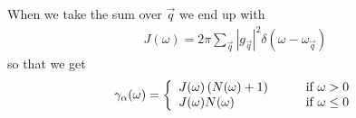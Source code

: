 When we take the sum over $\vec{q}$ we end up with 
\begin{align}
  J(\omega) = 2\pi \sum_\vec{q} |g_\vec{q}|^2 \delta(\omega-\omega_\vec{q})
\end{align}
so that we get
\begin{align}
  \gamma_\alpha(\omega) = \left\{
    \begin{array}{l l}
    J(\omega)\left(N(\omega) + 1\right) & \qquad \text{if $\omega > 0$}\\
    J(\omega)N(\omega) & \qquad \text{if $\omega \leq 0$}
  \end{array} \right.
\end{align}


